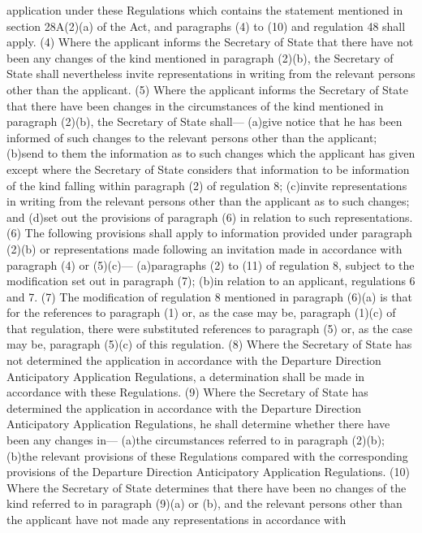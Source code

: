 \documentclass[a4paper]{article}
\begin{document}
application under these Regulations which contains the statement mentioned in
section 28A(2)(a) of the Act, and paragraphs (4) to (10) and regulation 48 shall
apply.
(4) Where the applicant informs the Secretary of State that there have not been
any changes of the kind mentioned in paragraph (2)(b), the Secretary of State
shall nevertheless invite representations in writing from the relevant persons
other than the applicant.
(5) Where the applicant informs the Secretary of State that there have been
changes in the circumstances of the kind mentioned in paragraph (2)(b), the
Secretary of State shall—
(a)give notice that he has been informed of such changes to the relevant persons
other than the applicant;
(b)send to them the information as to such changes which the applicant has given
except where the Secretary of State considers that information to be information
of the kind falling within paragraph (2) of regulation 8;
(c)invite representations in writing from the relevant persons other than the
applicant as to such changes; and
(d)set out the provisions of paragraph (6) in relation to such representations.
(6) The following provisions shall apply to information provided under paragraph
(2)(b) or representations made following an invitation made in accordance with
paragraph (4) or (5)(c)—
(a)paragraphs (2) to (11) of regulation 8, subject to the modification set out
in paragraph (7);
(b)in relation to an applicant, regulations 6 and 7.
(7) The modification of regulation 8 mentioned in paragraph (6)(a) is that for
the references to paragraph (1) or, as the case may be, paragraph (1)(c) of that
regulation, there were substituted references to paragraph (5) or, as the case
may be, paragraph (5)(c) of this regulation.
(8) Where the Secretary of State has not determined the application in
accordance with the Departure Direction Anticipatory Application Regulations, a
determination shall be made in accordance with these Regulations.
(9) Where the Secretary of State has determined the application in accordance
with the Departure Direction Anticipatory Application Regulations, he shall
determine whether there have been any changes in—
(a)the circumstances referred to in paragraph (2)(b);
(b)the relevant provisions of these Regulations compared with the corresponding
provisions of the Departure Direction Anticipatory Application Regulations.
(10) Where the Secretary of State determines that there have been no changes of
the kind referred to in paragraph (9)(a) or (b), and the relevant persons other
than the applicant have not made any representations in accordance with
\end{document}
